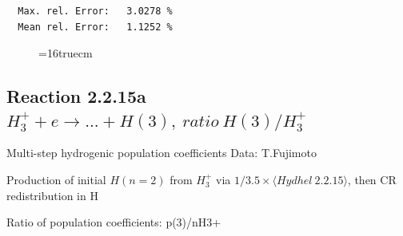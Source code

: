 \documentclass[12pt,dvips]{article}
\begin{document}
\begin{small}
\begin{verbatim}
  Max. rel. Error:   3.0278 %
  Mean rel. Error:   1.1252 %

\end{verbatim}\end{small}
\begin{figure} \label{2.2.14e}
\epsfxsize=16truecm
\end{figure}
\newpage

\subsection{
Reaction 2.2.15a $ H_3^+ + e \rightarrow ...+ H(3) , \   ratio ~ H(3)/H_3^+  $
}

 Multi-step hydrogenic population coefficients
 Data: T.Fujimoto

 Production of initial $H(n=2)$ from $H_3^+$ via $1/3.5 \times \langle Hydhel~ 2.2.15\rangle$,
 then CR redistribution in H

 Ratio of population coefficients: p(3)/nH3+
\end{document}
